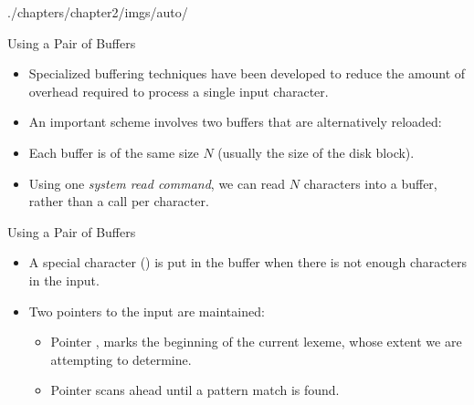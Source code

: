 \begin{graphicspathcontext}{{./chapters/chapter2/imgs/auto/}}
\begin{bibunit}[apalike]

\begin{frame}[t]{Using a Pair of Buffers}
	\begin{itemize}
	\item Specialized buffering techniques have been developed to reduce the amount of overhead required to process a single input character.
	\vfill
	\item An important scheme involves two buffers that are alternatively reloaded:
		\begin{center}
		{}
		\end{center}
	\vfill
	\item Each buffer is of the same size $N$ (usually the size of the disk block).
	\vfill
	\item Using one \emph{system read command}, we can read $N$ characters into a buffer, rather than a call per character.
	\end{itemize}
\end{frame}

\begin{frame}[t]{Using a Pair of Buffers}
	\begin{itemize}
	\item A special character () is put in the buffer when there is not enough characters in the input.
	\vfill
	\item Two pointers to the input are maintained: \begin{itemize}
		\item Pointer , marks the beginning of the current lexeme, whose extent we are attempting to determine.
		\item Pointer  scans ahead until a pattern match is found.
		\end{itemize}
	\end{itemize}
	\vfill
	\begin{center}
	{}
	\end{center}
\end{frame}


\end{bibunit}
\end{graphicspathcontext}
